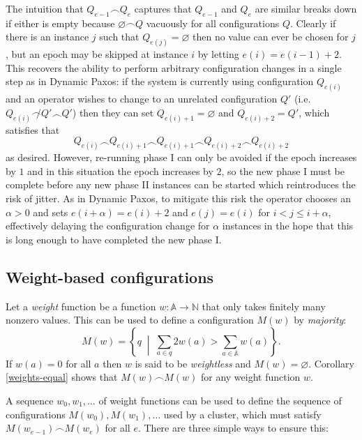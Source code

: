 \documentclass[journal]{IEEEtran}
\begin{document}
The intuition that $Q_{e-1} \frown Q_e$ captures that $Q_{e-1}$ and $Q_e$ are
similar breaks down if either is empty because $\varnothing \frown Q$ vacuously
for all configurations $Q$. Clearly if there is an instance $j$ such that
$Q_{e(j)} = \varnothing$ then no value can ever be chosen for $j$, but an epoch
may be skipped at instance $i$ by letting $e(i) = e(i-1) + 2$.  This recovers
the ability to perform arbitrary configuration changes in a single step as in
Dynamic Paxos: if the system is currently using configuration $Q_{e(i)}$ and an
operator wishes to change to an unrelated configuration $Q'$ (i.e.  $Q_{e(i)}
\not\frown Q' \frown Q'$) then they can set $Q_{e(i)+1} = \varnothing$ and
$Q_{e(i)+2} = Q'$, which satisfies that \[Q_{e(i)} \frown Q_{e(i) + 1} \frown
Q_{e(i)+1} \frown Q_{e(i) + 2} \frown Q_{e(i) + 2}\] as desired. However,
re-running phase I can only be avoided if the epoch increases by $1$ and in
this situation the epoch increases by $2$, so the new phase I must be complete
before any new phase II instances can be started which reintroduces the risk of
jitter.  As in Dynamic Paxos, to mitigate this risk the operator chooses an
$\alpha > 0$ and sets $e(i+\alpha) = e(i)+2$ and $e(j) = e(i)$ for $i < j \le i
+ \alpha$, effectively delaying the configuration change for $\alpha$ instances
in the hope that this is long enough to have completed the new phase I.

\subsection{Weight-based configurations} \label{weight-based-configurations}

Let a \textit{weight} function be a function $w : \mathbb A \to \mathbb N$ that
only takes finitely many nonzero values. This can be used to define a
configuration $M(w)$ by \textit{majority}: \[M(w) = \left\{ q \;\middle|\;
\sum_{a \in q} 2 w(a) > \sum_{a \in \mathbb A} w(a) \right\}.\] If $w(a) = 0$
for all $a$ then $w$ is said to be \textit{weightless} and $M(w) =
\varnothing$.  Corollary \ref{weights-equal} shows that $M(w) \frown M(w)$ for
any weight function $w$.

A sequence $w_0, w_1, \ldots$ of weight functions can be used to define the
sequence of configurations $M(w_0), M(w_1), \ldots$ used by a cluster, which
must satisfy $M(w_{e-1}) \frown M(w_e)$ for all $e$.  There are three simple
ways to ensure this:
\end{document}
